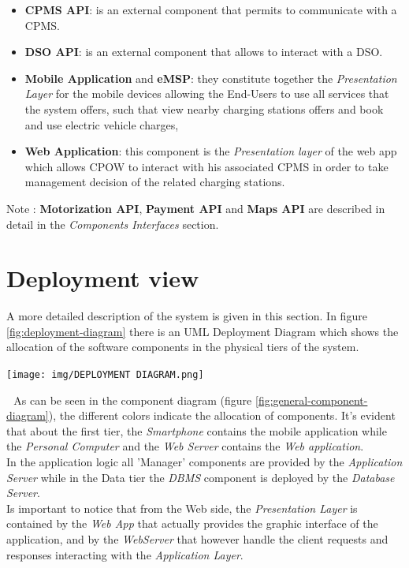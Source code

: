 \documentclass[a4paper]{report}
\begin{document}
\begin{itemize}
\item \textbf{CPMS API}: is an external component that permits to communicate with a CPMS.

\item \textbf{DSO API}: is an external component that allows to interact with a DSO.

\item \textbf{Mobile Application} and \textbf{eMSP}: they constitute together the \textit{Presentation Layer} for the mobile devices allowing the End-Users to use all services that the system offers, such that view nearby charging stations offers and book and use
electric vehicle charges,

\item \textbf{Web Application}: this component is the \textit{Presentation layer} of the web app which allows CPOW to interact with his associated CPMS in order to take management decision of the related charging stations.
\end{itemize}

Note : \textbf{Motorization API}, \textbf{Payment API} and \textbf{Maps API} are described in detail in the \textit{Components Interfaces} section.
\section{Deployment view}

A more detailed description of the system is given in this section. In figure \ref{fig:deployment-diagram} there is an UML Deployment Diagram which shows the allocation of the software components in the physical tiers of the system.

\begin{minipage}{\linewidth}
        \centering
        \texttt{[image: img/DEPLOYMENT DIAGRAM.png]}
        \label{fig:deployment-diagram}
\end{minipage}



$ $\newline
$ $\newline
As can be seen in the component diagram (figure \ref{fig:general-component-diagram}), the different colors indicate the allocation of components.
It's evident that about the first tier, the \textit{Smartphone} contains the mobile application while the \textit{Personal Computer} and the \textit{Web Server} contains the \textit{Web application}.\\
In the application logic all 'Manager' components are provided by the \textit{Application Server} while in the Data tier the \textit{DBMS} component is deployed by the \textit{Database Server}.\\
Is important to notice that from the Web side, the \textit{Presentation Layer} is contained by the \textit{Web App} that actually provides the graphic interface of the application, and by the \textit{WebServer} that however handle the client requests and responses interacting with the \textit{Application Layer}.
\end{document}
